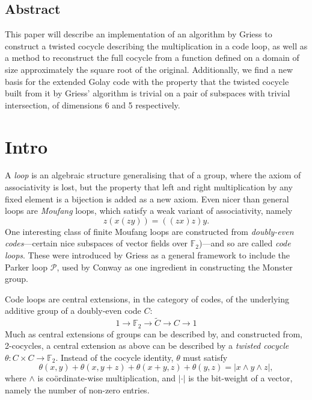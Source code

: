 \documentclass[a4paper,debug]{tufte-handout}
\title{\TheTitle}
\date{\today}
\author{Ben Nagy and David Michael Roberts}
\theoremstyle{plain}
\theoremstyle{definition}
\theoremstyle{remark}
\def\cP{\mathcal{P}}
\def\FF{\mathbb{F}}
\begin{document}
\maketitle

\medskip

\subsection{Abstract}
\noindent This paper will describe an implementation of an algorithm by Griess to construct a twisted cocycle describing the multiplication in a code loop, as well as a method to reconstruct the full cocycle from a function defined on a domain of size approximately the square root of the original. 
Additionally, we find a new basis for the extended Golay code with the property that the twisted cocycle built from it by Griess' algorithm is trivial on a pair of subspaces with trivial intersection, of dimensions 6 and 5 respectively.


\section{Intro}

A \emph{loop} is an algebraic structure generalising that of a group, where the axiom of associativity is lost, but the property that left and right multiplication by any fixed element is a bijection is added as a new axiom.
Even nicer than general loops are \emph{Moufang} loops, which satisfy a weak variant of associativity, namely
\[
	z(x(zy)) = ((zx)z)y.
\]
One interesting class of finite Moufang loops are constructed from \emph{doubly-even codes}---certain nice subspaces of vector fields over $\FF_2$)---and so are called \emph{code loops}. 
These were introduced by Griess\cite{Griess} as a general framework to include the Parker loop $\cP$, used by Conway as one ingredient in constructing the Monster group.

Code loops are central extensions, in the category of codes, of the underlying additive group of a doubly-even code $C$:
\[
	1\to \FF_2 \to \widetilde{C} \to C \to 1
\]
Much as central extensions of groups can be described by, and constructed from, 2-cocycles, a central extension as above can be described by a \emph{twisted cocycle} $\theta\colon C\times C \to \FF_2$. 
Instead of the cocycle identity, $\theta$ must satisfy
\[
	\theta(x,y) + \theta(x,y+z) + \theta(x+y,z) + \theta(y,z) = |x\wedge y \wedge z|,
\]
where $\wedge$ is co\"ordinate-wise multiplication, and $|\cdot|$ is the bit-weight of a vector, namely the number of non-zero entries.
\end{document}
